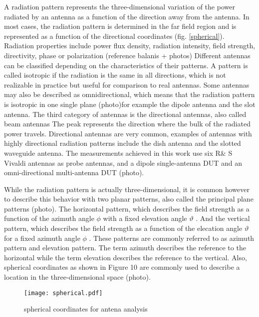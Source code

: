 A radiation pattern represents the three-dimensional variation of the power radiated by an antenna as a function of the direction away from the antenna. In most cases, the radiation pattern is determined in the far field region and is represented as a function of the directional coordinates (fig. \ref{spherical}). Radiation properties include power flux density, radiation intensity, field strength, directivity, phase or polarization (reference balanis + photos) Different antennas can be classified depending on the characteristics of their patterns. A pattern is called isotropic if the radiation is the same in all directions, which is not realizable in practice but useful for comparison to real antennas. Some antennas may also be described as omnidirectional, which means that the radiation pattern is isotropic in one single plane (photo)for example the dipole antenna and the slot antenna. The third category of antennas is the directional antennas, also called beam antennas The peak represents the direction where the bulk of the radiated power travels. Directional antennas are very common, examples of antennas with highly directional radiation patterns include the  dish antenna and the slotted waveguide antenna. The measurements achieved in this work use six R$\&$ S Vivaldi antennas as probe antennas, and a dipole single-antenna DUT and an omni-directional multi-antenna DUT (photo).

While the radiation pattern is actually three-dimensional, it is common however to describe this behavior with two planar patterns, also called the principal plane patterns (photo). The horizontal pattern, which describes the field strength as a function of the azimuth angle \textit{$ \phi $ } with a fixed elevation angle \textit{$ \vartheta $ }. And the vertical pattern, which describes the field strength as a function of the elecation angle \textit{$ \vartheta $ } for a fixed azimuth angle \textit{$ \phi $ }. These patterns are commonly referred to as azimuth pattern and elevation pattern. The term azimuth describes the reference to the horizontal while the term elevation describes the reference to the vertical. Also, spherical coordinates as shown in Figure 10 are commonly used to describe a location in the three-dimensional space (photo).

\begin{figure}[H]
\centering
\texttt{[image: spherical.pdf]}
\caption{spherical coordinates for antena analysis}
\label{fig:resP}
\end{figure}

